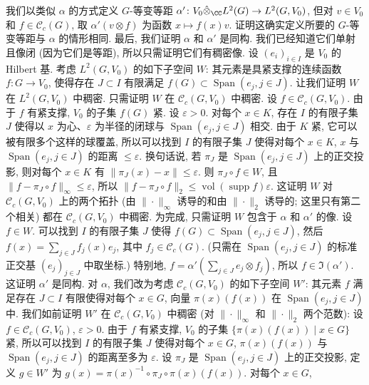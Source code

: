 \begin{solution}
我们以类似 $\alpha$ 的方式定义 $G$-等变等距 $\alpha' \colon V_0 \hat{\otimes}_{\CC}L^2(G) \to L^2(G, V_0)$, 但对 $v \in V_0$ 和 $f \in \mathcal{C}_c(G)$, 取 $\alpha'(v \otimes f)$ 为函数 $x \longmapsto f(x)v$. 证明这确实定义所要的 $G$-等变等距与 $\alpha$ 的情形相同.
最后, 我们证明 $\alpha$ 和 $\alpha'$ 是同构. 我们已经知道它们单射且像闭 (因为它们是等距), 所以只需证明它们有稠密像.
设 $(e_i)_{i \in I}$ 是 $V_0$ 的 Hilbert 基. 考虑 $L^2(G, V_0)$ 的如下子空间 $W$: 其元素是具紧支撑的连续函数 $f \colon G \to V_0$, 使得存在 $J \subset I$ 有限满足 $f(G) \subset \operatorname{Span}(e_j, j \in J)$. 让我们证明 $W$ 在 $L^2(G, V_0)$ 中稠密. 只需证明 $W$ 在 $\mathcal{C}_c(G, V_0)$ 中稠密. 设 $f \in \mathcal{C}_c(G, V_0)$. 由于 $f$ 有紧支撑, $V_0$ 的子集 $f(G)$ 紧. 设 $\varepsilon > 0$. 对每个 $x \in K$, 存在 $I$ 的有限子集 $J$ 使得以 $x$ 为心、$\varepsilon$ 为半径的闭球与 $\operatorname{Span}(e_j, j \in J)$ 相交. 由于 $K$ 紧, 它可以被有限多个这样的球覆盖, 所以可以找到 $I$ 的有限子集 $J$ 使得对每个 $x \in K$, $x$ 与 $\operatorname{Span}(e_j, j \in J)$ 的距离 $\leq \varepsilon$. 换句话说, 若 $\pi_J$ 是 $\operatorname{Span}(e_j, j \in J)$ 上的正交投影, 则对每个 $x \in K$ 有 $\|\pi_J(x) - x\| \leq \varepsilon$. 则 $\pi_J \circ f \in W$, 且 $\|f - \pi_J \circ f\|_{\infty} \leq \varepsilon$, 所以 $\|f - \pi_J \circ f\|_2 \leq \operatorname{vol}(\operatorname{supp} f)\varepsilon$. 这证明 $W$ 对 $\mathcal{C}_c(G, V_0)$ 上的两个拓扑 (由 $\|\cdot\|_{\infty}$ 诱导的和由 $\|\cdot\|_2$ 诱导的; 这里只有第二个相关) 都在 $\mathcal{C}_c(G, V_0)$ 中稠密. 为完成, 只需证明 $W$ 包含于 $\alpha$ 和 $\alpha'$ 的像. 设 $f \in W$. 可以找到 $I$ 的有限子集 $J$ 使得 $f(G) \subset \operatorname{Span}(e_j, j \in J)$, 然后 $f(x) = \sum_{j \in J}f_j(x)e_j$, 其中 $f_j \in \mathcal{C}_c(G)$. (只需在 $\operatorname{Span}(e_j, j \in J)$ 的标准正交基 $(e_j)_{j \in J}$ 中取坐标.) 特别地, $f = \alpha'(\sum_{j \in J}e_j \otimes f_j)$, 所以 $f \in \Im(\alpha')$. 这证明 $\alpha'$ 是同构.
对 $\alpha$, 我们改为考虑 $\mathcal{C}_c(G, V_0)$ 的如下子空间 $W'$: 其元素 $f$ 满足存在 $J \subset I$ 有限使得对每个 $x \in G$, 向量 $\pi(x)(f(x))$ 在 $\operatorname{Span}(e_j, j \in J)$ 中. 我们如前证明 $W'$ 在 $\mathcal{C}_c(G, V_0)$ 中稠密 (对 $\|\cdot\|_{\infty}$ 和 $\|\cdot\|_2$ 两个范数): 设 $f \in \mathcal{C}_c(G, V_0)$, $\varepsilon > 0$. 由于 $f$ 有紧支撑, $V_0$ 的子集 $\{\pi(x)(f(x)) \mid x \in G\}$ 紧, 所以可以找到 $I$ 的有限子集 $J$ 使得对每个 $x \in G$, $\pi(x)(f(x))$ 与 $\operatorname{Span}(e_j, j \in J)$ 的距离至多为 $\varepsilon$. 设 $\pi_J$ 是 $\operatorname{Span}(e_j, j \in J)$ 上的正交投影, 定义 $g \in W'$ 为 $g(x) = \pi(x)^{-1}\circ\pi_J\circ\pi(x)(f(x))$. 对每个 $x \in G$,

\end{solution}
